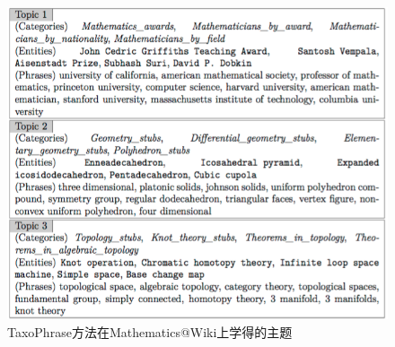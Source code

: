 \begin{frame}

\vspace{-7mm}
\begin{figure}
	\centering
	\caption{TaxoPhrase方法在Mathematics@Wiki上学得的主题}
    \includegraphics[width=0.8\columnwidth]{img/TD+/topics1.png}
\end{figure}

\end{frame}


